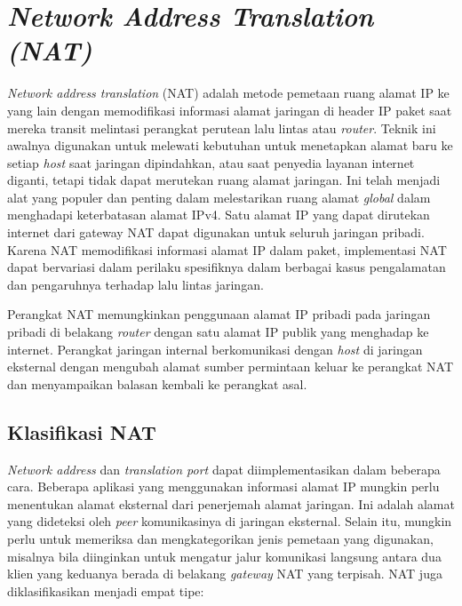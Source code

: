 \section{\emph{Network Address Translation (NAT)}}

\emph{Network address translation} (NAT) adalah metode pemetaan ruang alamat IP ke yang lain dengan memodifikasi informasi alamat jaringan di header IP paket saat mereka transit melintasi perangkat perutean lalu lintas atau \emph{router}. Teknik ini awalnya digunakan untuk melewati kebutuhan untuk menetapkan alamat baru ke setiap \emph{host} saat jaringan dipindahkan, atau saat penyedia layanan internet diganti, tetapi tidak dapat merutekan ruang alamat jaringan. Ini telah menjadi alat yang populer dan penting dalam melestarikan ruang alamat \emph{global} dalam menghadapi keterbatasan alamat IPv4. Satu alamat IP yang dapat dirutekan internet dari gateway NAT dapat digunakan untuk seluruh jaringan pribadi. Karena NAT memodifikasi informasi alamat IP dalam paket, implementasi NAT dapat bervariasi dalam perilaku spesifiknya dalam berbagai kasus pengalamatan dan pengaruhnya terhadap lalu lintas jaringan.

Perangkat NAT memungkinkan penggunaan alamat IP pribadi pada jaringan pribadi di belakang \emph{router} dengan satu alamat IP publik yang menghadap ke internet. Perangkat jaringan internal berkomunikasi dengan \emph{host} di jaringan eksternal dengan mengubah alamat sumber permintaan keluar ke perangkat NAT dan menyampaikan balasan kembali ke perangkat asal.

\subsection{Klasifikasi NAT}

\emph{Network address} dan \emph{translation port} dapat diimplementasikan dalam beberapa cara. Beberapa aplikasi yang menggunakan informasi alamat IP mungkin perlu menentukan alamat eksternal dari penerjemah alamat jaringan. Ini adalah alamat yang dideteksi oleh \emph{peer} komunikasinya di jaringan eksternal. Selain itu, mungkin perlu untuk memeriksa dan mengkategorikan jenis pemetaan yang digunakan, misalnya bila diinginkan untuk mengatur jalur komunikasi langsung antara dua klien yang keduanya berada di belakang \emph{gateway} NAT yang terpisah. NAT juga diklasifikasikan menjadi empat tipe:

